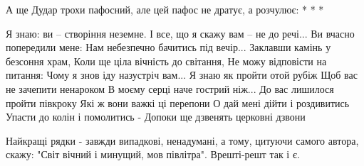 А ще Дудар трохи пафосний, але цей пафос не дратує, а розчулює:
* * *

Я знаю: ви -- створіння неземне.
І все, що я скажу вам -- не до речі...
Ви вчасно попередили мене:
Нам небезпечно бачитись під вечір...
Заклавши камінь у безсоння храм,
Коли ще ціла вічність до світання,
Не можу відповісти на питання:
Чому я знов іду назустріч вам...
Я знаю як пройти отой рубіж
Щоб вас не зачепити ненароком
В моєму серці наче гострий ніж...
До вас лишилося пройти півкроку
Які ж вони важкі ці перепони
О дай мені дійти і роздивитись
Упасти до колін і помолитись -
Допоки ще дзвенять церковні дзвони

Найкращі рядки - завжди випадкові, ненадумані, а тому, цитуючи самого автора,
скажу: "Світ вічний і минущий, мов півлітра". Врешті-решт так і є.
